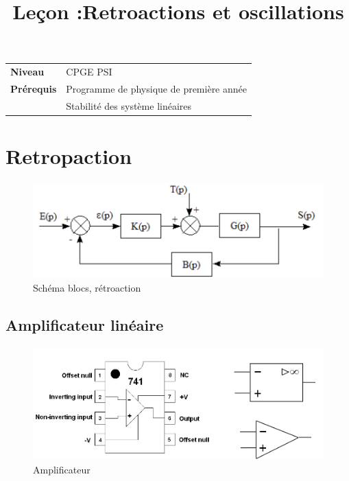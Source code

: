 \documentclass[10pt]{beamer}
\title{Leçon :Retroactions et oscillations}
\begin{document}
\begin{frame}{}
    \titlepage

    \begin{tabularx}{\textwidth}{l@{:\,\,}X}
        \textbf{Niveau} 	  & CPGE PSI\\
        \textbf{Prérequis} & Programme de physique de première année \\
        & Stabilité des système linéaires
    \end{tabularx}
\end{frame}

\begin{frame}
    \tableofcontents
\end{frame}

\section{Retropaction}

\begin{frame}{\insertsection}
    \begin{figure}
        \centering
        \includegraphics[width=1\textwidth]{2entree_1.png}
        \caption{Schéma blocs, rétroaction}
    \end{figure}
\end{frame}

\subsection{Amplificateur linéaire}

\begin{frame}{\insertsubsection}
    \begin{figure}
        \centering
        \includegraphics[width=1\textwidth]{AOP.png}
        \caption{Amplificateur}
    \end{figure}
\end{frame}
\end{document}
